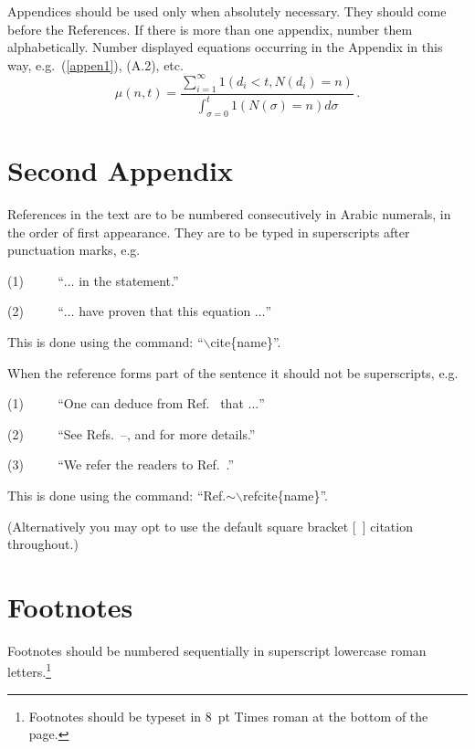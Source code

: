 \documentclass{ws-procs9x6}
\begin{document}
Appendices should be used only when absolutely necessary. They
should come before the References. If there is more than one
appendix, number them alphabetically. Number displayed equations
occurring in the Appendix in this way, e.g.~(\ref{appen1}), (A.2),
etc.
\begin{equation}
\mu(n, t) = \frac{\sum^\infty_{i=1} 1(d_i < t, 
N(d_i) = n)}{\int^t_{\sigma=0} 1(N(\sigma) = n)d\sigma}\,. \label{appen1}
\end{equation}

\section{Second Appendix}

References in the text are to be numbered consecutively in Arabic
numerals, in the order of first appearance. They are to be typed in
superscripts after punctuation marks, e.g.

(1) $ \qquad $ ``$\ldots$ in the statement.\cite{xyan}''

(2) $ \qquad $ ``$\ldots$ have proven\cite{bu}\cdash\cite{xyan} 
that this equation $\ldots$''

\noindent
This is done using the command: ``$\backslash$cite\{name\}''.

When the reference forms part of the sentence it should not 
be superscripts, e.g.

(1) $ \qquad $  ``One can deduce from Ref.~ that $\ldots$''

(2) $ \qquad $  ``See Refs.~--,  
and  for more details.'' 

(3) $ \qquad $  ``We refer the readers to Ref.~.''

\noindent
This is done using the command: ``Ref.$\sim$$\backslash$refcite\{name\}''.

\vspace*{8pt}
\noindent
(Alternatively you may opt to use the default square bracket [\ ] 
citation throughout.)

\section{Footnotes}
Footnotes should be numbered sequentially in superscript lowercase
roman letters.\footnote{Footnotes should be typeset in 8~pt Times
roman at the bottom of the page.}
\end{document}

